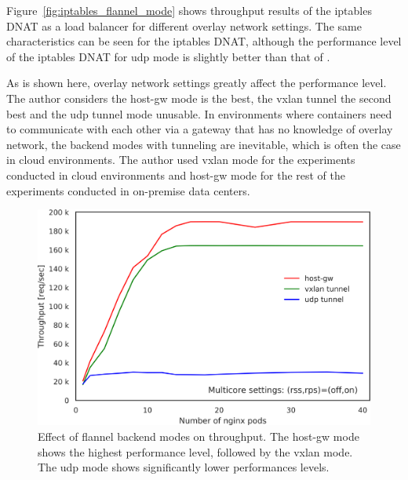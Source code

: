 Figure~\ref{fig:iptables_flannel_mode} shows throughput results of the iptables DNAT as a load balancer for different overlay network settings.
The same characteristics can be seen for the iptables DNAT, although the performance level of the iptables DNAT for udp mode is slightly better than that of .

As is shown here, overlay network settings greatly affect the performance level.
The author considers the host-gw mode is the best, the vxlan tunnel the second best and the udp tunnel mode unusable.
In environments where containers need to communicate with each other via a gateway that has no knowledge of overlay network, the backend modes with tunneling are inevitable, which is often the case in cloud environments. 
The author used vxlan mode for the experiments conducted in cloud environments and host-gw mode for the rest of the experiments conducted in on-premise data centers.

\begin{figure}[h]
  \centering
  \includegraphics[width=0.75\columnwidth]{Figs/ipvs_flannel_mode}

  \par\bigskip
  \centering
  \begin{minipage}{0.9\columnwidth}
    \caption[Effect of flannel backend modes on IPVS throughput]{
      Effect of flannel backend modes on  throughput.
      The host-gw mode shows the highest performance level, followed by the vxlan mode.
      The udp mode shows significantly lower performances levels.
    }
    \label{fig:ipvs_flannel_mode}
  \end{minipage}
\end{figure}

